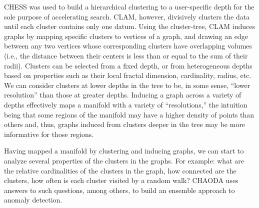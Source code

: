 CHESS was used to build a hierarchical clustering to a user-specific depth for the sole purpose of accelerating search.
CLAM, however, divisively clusters the data until each cluster contains only one datum.
Using the cluster-tree, CLAM induces graphs by mapping specific clusters to vertices of a graph, and drawing an edge between any two vertices whose corresponding clusters have overlapping volumes (i.e., the distance between their centers is less than or equal to the sum of their radii).
Clusters can be selected from a fixed depth, or from heterogeneous depths based on properties such as their local fractal dimension, cardinality, radius, etc.
We can consider clusters at lower depths in the tree to be, in some sense, ``lower resolution'' than those at greater depths.
Inducing a graph across a variety of depths effectively maps a manifold with a variety of ``resolutions,'' the intuition being that some regions of the manifold may have a higher density of points than others and, thus, graphs induced from clusters deeper in the tree may be more informative for those regions.

Having mapped a manifold by clustering and inducing graphs, we can start to analyze several properties of the clusters in the graphs.
For example: what are the relative cardinalities of the clusters in the graph, how connected are the clusters, how often is each cluster visited by a random walk?
CHAODA uses answers to such questions, among others, to build an ensemble approach to anomaly detection.
